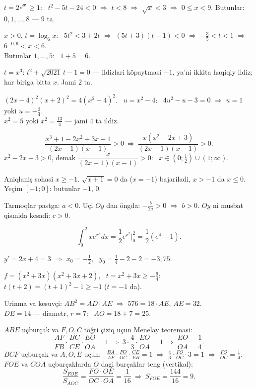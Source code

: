 $t=2^{\sqrt x}\ge1$: \ $t^2-5t-24<0$ $\Rightarrow$ $t<8$ $\Rightarrow$ $\sqrt x<3$ $\Rightarrow$ $0\le x<9$. Butunlar: $0,1,\dots,8$ — $9$ ta.

$x>0$, $t=\log_6x$: \ $5t^2<3+2t$ $\Rightarrow$ $(5t+3)(t-1)<0$ $\Rightarrow$ $-\frac35<t<1$ $\Rightarrow$ $6^{-0{,}6}<x<6$.\\
Butunlar $1,\dots,5$: \ $1+5=6$.

$t=x^3$: $t^2+\sqrt{2021}\,t-1=0$ — ildizlari köpaytmasi $-1$, ya'ni ikkita haqiqiy ildiz; har biriga bitta $x$. Jami $2$ ta.

$(2x-4)^2(x+2)^2=4\left(x^2-4\right)^2$. \ $u=x^2-4$: \ $4u^2-u-3=0$ $\Rightarrow$ $u=1$ yoki $u=-\frac34$.\\
$x^2=5$ yoki $x^2=\frac{13}4$ — jami $4$ ta ildiz.

\[\frac{x^3+1-2x^2+3x-1}{(2x-1)(x-1)}>0\ \Rightarrow\ \frac{x\left(x^2-2x+3\right)}{(2x-1)(x-1)}>0.\]
$x^2-2x+3>0$, demak $\dfrac x{(2x-1)(x-1)}>0$: \ $x\in\left(0;\frac12\right)\cup(1;\infty)$.

Aniqlaniş sohasi $x\ge-1$. $\sqrt{x+1}=0$ da ($x=-1$) bajariladi, $x>-1$ da $x\le0$. Yeçim $[-1;0]$: butunlar $-1$, $0$.

Tarmoqlar pastga: $a<0$. Uçi $Oy$ dan öngda: $-\frac b{2a}>0$ $\Rightarrow$ $b>0$. $Oy$ ni musbat qismida kesadi: $c>0$.

\[\int_0^2xe^{x^2}dx=\frac12e^{x^2}\Big|_0^2=\frac12\left(e^4-1\right).\]

$y'=2x+4=3$ $\Rightarrow$ $x_0=-\frac12$, \ $y_0=\frac14-2-2=-3{,}75$.

$f=\left(x^2+3x\right)\left(x^2+3x+2\right)$, \ $t=x^2+3x\ge-\frac94$: \ $t(t+2)=(t+1)^2-1\ge-1$ ($t=-1$ da).

Urinma va kesuvçi: $AB^2=AD\cdot AE$ $\Rightarrow$ $576=18\cdot AE$, $AE=32$.\\
$DE=14$ — diametr, $r=7$: \ $AO=18+7=25$.

$ABE$ uçburçak va $F,O,C$ töğri çiziq uçun Menelay teoremasi:
\[\frac{AF}{FB}\cdot\frac{BC}{CE}\cdot\frac{EO}{OA}=1\ \Rightarrow\ 3\cdot\frac43\cdot\frac{EO}{OA}=1\ \Rightarrow\ \frac{EO}{OA}=\frac14.\]
$BCF$ uçburçak va $A,O,E$ uçun: \ $\frac{BA}{AF}\cdot\frac{FO}{OC}\cdot\frac{CE}{EB}=1$ $\Rightarrow$ $\frac43\cdot\frac{FO}{OC}\cdot3=1$ $\Rightarrow$ $\frac{FO}{OC}=\frac14$.\\
$FOE$ va $COA$ uçburçaklarda $O$ dagi burçaklar teng (vertikal):
\[\frac{S_{FOE}}{S_{AOC}}=\frac{FO\cdot OE}{OC\cdot OA}=\frac1{16}\ \Rightarrow\ S_{FOE}=\frac{144}{16}=9.\]

